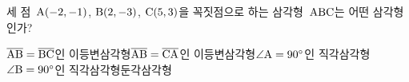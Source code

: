 세 점~$\mathrm{A}(-2{,}\mkern3mu\mathopen{}-1)$, $\mathrm{B}(2{,}\mkern3mu\mathopen{}-3)$, $\mathrm{C}(5{,}\mkern3mu\mathopen{}3)$을 꼭짓점으로 하는 삼각형~$\mathrm{ABC}$는 어떤 삼각형인가?
\begin{choicesv}{$\overline{\mathrm{AB}}=\overline{\mathrm{BC}}$인 이등변삼각형}{$\overline{\mathrm{AB}}=\overline{\mathrm{CA}}$인 이등변삼각형}{$\angle\mathrm{A}=90^{\circ}$인 직각삼각형}{$\angle\mathrm{B}=90^{\circ}$인 직각삼각형}{둔각삼각형}\end{choicesv}
